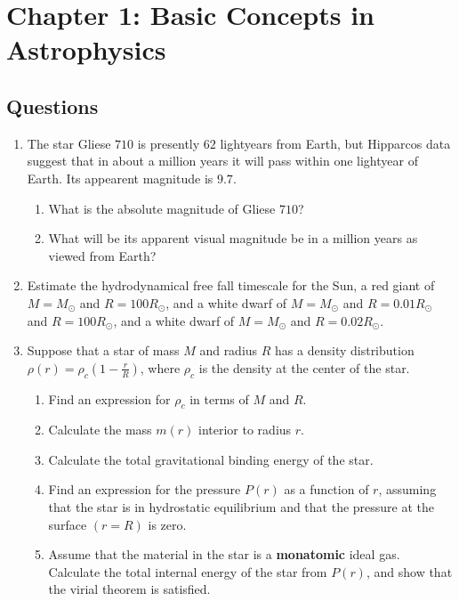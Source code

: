 \section{Chapter 1: Basic Concepts in Astrophysics}

\subsection{Questions}

\begin{enumerate}[label=1.\arabic*]
    \item The star Gliese $710$ is presently $62$ lightyears from Earth, but Hipparcos data suggest that in about a million years it will pass within one lightyear of Earth. Its appearent magnitude is $9.7$.
    \begin{enumerate}[label=(\alph*)]
        \item What is the absolute magnitude of Gliese $710$?
        \item What will be its apparent visual magnitude be in a million years as viewed from Earth?  
    \end{enumerate}   
    \item Estimate the hydrodynamical free fall timescale for the Sun, a red giant of $M=M_{\odot}$ and $R=100R_{\odot}$, and a white dwarf of $M=M_{\odot}$ and $R=0.01R_{\odot}$ and $R=100R_{\odot}$, 
    and a white dwarf of $M=M_{\odot}$ and $R=0.02R_{\odot}$. 
    \item Suppose that a star of mass $M$ and radius $R$ has a density distribution $\rho(r) = \rho_c(1 - \frac{r}{R})$,
where $\rho_c$ is the density at the center of the star.
    \begin{enumerate}[label=(\alph*)]
        \item Find an expression for $\rho_c$ in terms of $M$ and $R$.
        \item Calculate the mass $m(r)$ interior to radius $r$.
        \item Calculate the total gravitational binding energy of the star.
        \item Find an expression for the pressure $P(r)$ as a function of $r$, assuming that the star is in hydrostatic equilibrium and that the pressure at the surface $(r = R)$ is zero.
        \item Assume that the material in the star is a \textbf{monatomic} ideal gas. Calculate the total
                internal energy of the star from $P(r)$, and show that the virial theorem is satisfied.
    \end{enumerate}
\end{enumerate}

